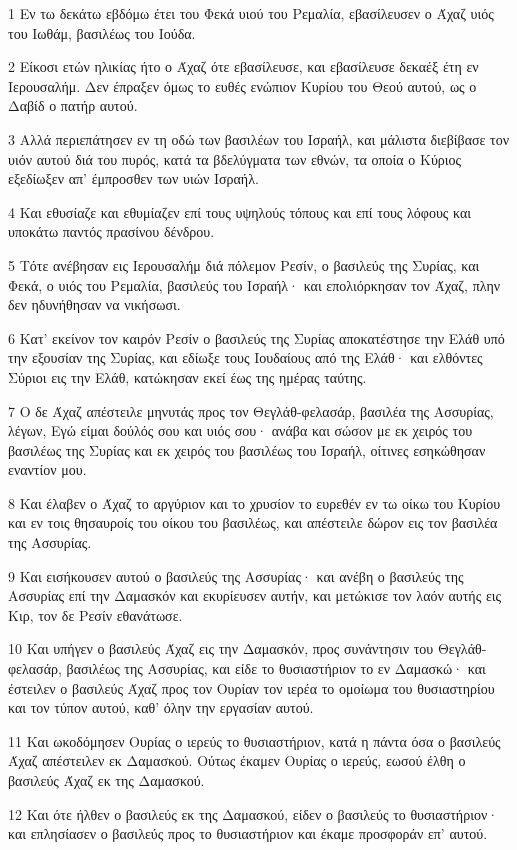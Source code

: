 \par 1 Εν τω δεκάτω εβδόμω έτει του Φεκά υιού του Ρεμαλία, εβασίλευσεν ο Άχαζ υιός του Ιωθάμ, βασιλέως του Ιούδα.
\par 2 Είκοσι ετών ηλικίας ήτο ο Άχαζ ότε εβασίλευσε, και εβασίλευσε δεκαέξ έτη εν Ιερουσαλήμ. Δεν έπραξεν όμως το ευθές ενώπιον Κυρίου του Θεού αυτού, ως ο Δαβίδ ο πατήρ αυτού.
\par 3 Αλλά περιεπάτησεν εν τη οδώ των βασιλέων του Ισραήλ, και μάλιστα διεβίβασε τον υιόν αυτού διά του πυρός, κατά τα βδελύγματα των εθνών, τα οποία ο Κύριος εξεδίωξεν απ' έμπροσθεν των υιών Ισραήλ.
\par 4 Και εθυσίαζε και εθυμίαζεν επί τους υψηλούς τόπους και επί τους λόφους και υποκάτω παντός πρασίνου δένδρου.
\par 5 Τότε ανέβησαν εις Ιερουσαλήμ διά πόλεμον Ρεσίν, ο βασιλεύς της Συρίας, και Φεκά, ο υιός του Ρεμαλία, βασιλεύς του Ισραήλ· και επολιόρκησαν τον Άχαζ, πλην δεν ηδυνήθησαν να νικήσωσι.
\par 6 Κατ' εκείνον τον καιρόν Ρεσίν ο βασιλεύς της Συρίας αποκατέστησε την Ελάθ υπό την εξουσίαν της Συρίας, και εδίωξε τους Ιουδαίους από της Ελάθ· και ελθόντες Σύριοι εις την Ελάθ, κατώκησαν εκεί έως της ημέρας ταύτης.
\par 7 Ο δε Άχαζ απέστειλε μηνυτάς προς τον Θεγλάθ-φελασάρ, βασιλέα της Ασσυρίας, λέγων, Εγώ είμαι δούλός σου και υιός σου· ανάβα και σώσον με εκ χειρός του βασιλέως της Συρίας και εκ χειρός του βασιλέως του Ισραήλ, οίτινες εσηκώθησαν εναντίον μου.
\par 8 Και έλαβεν ο Άχαζ το αργύριον και το χρυσίον το ευρεθέν εν τω οίκω του Κυρίου και εν τοις θησαυροίς του οίκου του βασιλέως, και απέστειλε δώρον εις τον βασιλέα της Ασσυρίας.
\par 9 Και εισήκουσεν αυτού ο βασιλεύς της Ασσυρίας· και ανέβη ο βασιλεύς της Ασσυρίας επί την Δαμασκόν και εκυρίευσεν αυτήν, και μετώκισε τον λαόν αυτής εις Κιρ, τον δε Ρεσίν εθανάτωσε.
\par 10 Και υπήγεν ο βασιλεύς Άχαζ εις την Δαμασκόν, προς συνάντησιν του Θεγλάθ-φελασάρ, βασιλέως της Ασσυρίας, και είδε το θυσιαστήριον το εν Δαμασκώ· και έστειλεν ο βασιλεύς Άχαζ προς τον Ουρίαν τον ιερέα το ομοίωμα του θυσιαστηρίου και τον τύπον αυτού, καθ' όλην την εργασίαν αυτού.
\par 11 Και ωκοδόμησεν Ουρίας ο ιερεύς το θυσιαστήριον, κατά η πάντα όσα ο βασιλεύς Άχαζ απέστειλεν εκ Δαμασκού. Ούτως έκαμεν Ουρίας ο ιερεύς, εωσού έλθη ο βασιλεύς Άχαζ εκ της Δαμασκού.
\par 12 Και ότε ήλθεν ο βασιλεύς εκ της Δαμασκού, είδεν ο βασιλεύς το θυσιαστήριον· και επλησίασεν ο βασιλεύς προς το θυσιαστήριον και έκαμε προσφοράν επ' αυτού.
